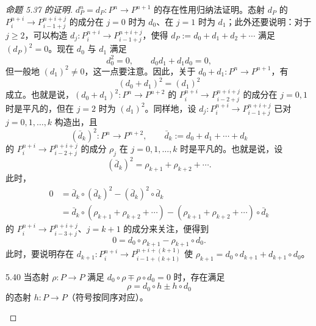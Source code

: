 \begin{proof}[命题 5.37 的证明]
$d_P^n=d_P\colon P^n\to P^{n+1}$ 的存在性用归纳法证明。态射 $d_P$ 的 $P_i^{n+i}\to P_{i-1+j}^{n+i+j}$ 的成分在 $j=0$ 时为 $d_0$、在 $j=1$ 时为 $d_1$；此外还要说明：对于 $j\ge 2$，可以构造 $d_j\colon P_i^{n+i}\to P_{i-1+j}^{n+i+j}$，使得 $d_P:=d_0+d_1+d_2+\cdots$ 满足 $(d_P)^2=0$。现在 $d_0$ 与 $d_1$ 满足
\[
  d_0^2=0,\qquad d_0 d_1+d_1 d_0=0,
\]
但一般地 $(d_1)^2\neq 0$，这一点要注意。因此，关于 $d_0+d_1\colon P^n\to P^{n+1}$，有
\[
  (d_0+d_1)^2=(d_1)^2
\]
成立。也就是说，$(d_0+d_1)^2\colon P^n\to P^{n+2}$ 的 $P_i^{n+i}\to P_{i-2+j}^{n+i+j}$ 的成分在 $j=0,1$ 时是平凡的，但在 $j=2$ 时为 $(d_1)^2$。同样地，设 $d_j\colon P_i^{n+i}\to P_{i-1+j}^{n+i+j}$ 已对 $j=0,1,\ldots,k$ 构造出，且
\[
  (\bar d_k)^2\colon P^n\to P^{n+2},\qquad \bar d_k:=d_0+d_1+\cdots+d_k
\]
的 $P_i^{n+i}\to P_{i-2+j}^{n+i+j}$ 的成分 $\rho_j$ 在 $j=0,1,\ldots,k$ 时是平凡的。也就是说，设
\[
  (\bar d_k)^2=\rho_{k+1}+\rho_{k+2}+\cdots.
\]
此时，
\begin{align*}
  0 &= \bar d_k\circ(\bar d_k)^2-(\bar d_k)^2\circ\bar d_k\\
    &= \bar d_k\circ(\rho_{k+1}+\rho_{k+2}+\cdots)-(\rho_{k+1}+\rho_{k+2}+\cdots)\circ\bar d_k
\end{align*}
的 $P_i^{n+i}\to P_{i-3+j}^{n+i+j}$、$j=k+1$ 的成分来关注，便得到
\[
  0=d_0\circ\rho_{k+1}-\rho_{k+1}\circ d_0.
\]
此时，要说明存在 $d_{k+1}\colon P_i^{n+i}\to P_{i-1+(k+1)}^{n+i+(k+1)}$ 使 $\rho_{k+1}=d_0\circ d_{k+1}+d_{k+1}\circ d_0$。


\begin{lemma}{5.40}
当态射 $\rho\colon P\to P$ 满足 $d_0\circ\rho\mp\rho\circ d_0=0$ 时，存在满足
\[
  \rho=d_0\circ h\pm h\circ d_0
\]
的态射 $h\colon P\to P$（符号按同序对应）。
\end{lemma}


\end{proof}
